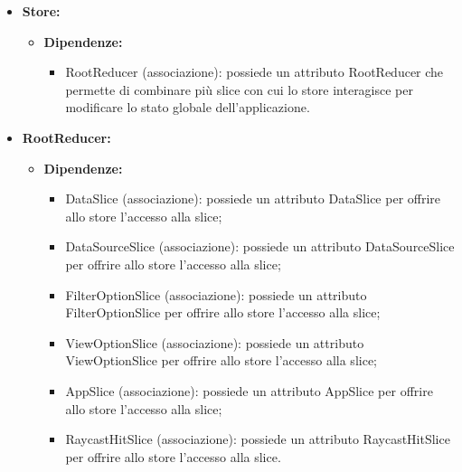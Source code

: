 \begin{itemize}
      \item \textbf{Store:}
            \begin{itemize}
                  \item \textbf{Dipendenze:}
                        \begin{itemize}
                              \item RootReducer (associazione): possiede un attributo RootReducer che permette di
                                    combinare più slice con cui lo store interagisce per modificare lo stato
                                    globale dell'applicazione.
                        \end{itemize}
            \end{itemize}

      \item \textbf{RootReducer:}
            \begin{itemize}
                  \item \textbf{Dipendenze:}
                        \begin{itemize}
                              \item DataSlice (associazione): possiede un attributo DataSlice per offrire allo
                                    store l'accesso alla slice;
                              \item DataSourceSlice (associazione): possiede un attributo DataSourceSlice per
                                    offrire allo store l'accesso alla slice;
                              \item FilterOptionSlice (associazione): possiede un attributo FilterOptionSlice per
                                    offrire allo store l'accesso alla slice;
                              \item ViewOptionSlice (associazione): possiede un attributo ViewOptionSlice per
                                    offrire allo store l'accesso alla slice;
                              \item AppSlice (associazione): possiede un attributo AppSlice per offrire allo store
                                    l'accesso alla slice;
                              \item RaycastHitSlice (associazione): possiede un attributo RaycastHitSlice per
                                    offrire allo store l'accesso alla slice.
                        \end{itemize}
            \end{itemize}
\end{itemize}

